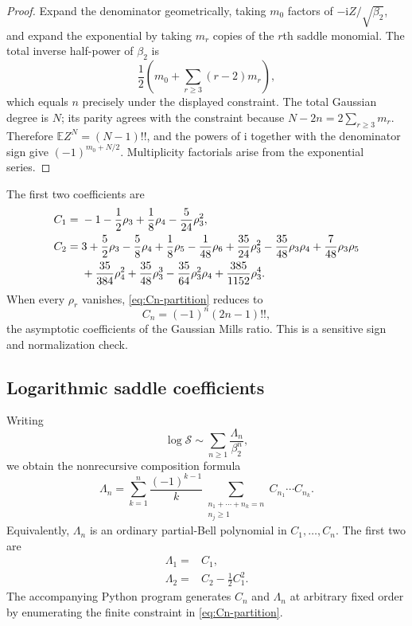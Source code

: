 \documentclass[11pt,oneside]{article}
\numberwithin{equation}{section}
\theoremstyle{definition}
\theoremstyle{remark}
\newcommand{\E}{\mathbb E}
\newcommand{\ii}{\mathrm i}
\begin{document}
\begin{proof}
Expand the denominator geometrically, taking $m_0$ factors of
$-\ii Z/\sqrt{\beta_2}$, and expand the exponential by taking $m_r$ copies of
the $r$th saddle monomial.  The total inverse half-power of $\beta_2$ is
\[
 \frac12\left(m_0+\sum_{r\ge3}(r-2)m_r\right),
\]
which equals $n$ precisely under the displayed constraint.  The total Gaussian
degree is $N$; its parity agrees with the constraint because
$N-2n=2\sum_{r\ge3}m_r$.  Therefore
$\E Z^N=(N-1)!!$, and the powers of $\ii$ together with the denominator sign
give $(-1)^{m_0+N/2}$.  Multiplicity factorials arise from the exponential
series.
\end{proof}

The first two coefficients are
\begin{align}
 C_1={}&-1-\frac12\rho_3+\frac18\rho_4-\frac5{24}\rho_3^2,
 \label{eq:C1}\\
 C_2={}&3+\frac52\rho_3-\frac58\rho_4+\frac18\rho_5-\frac1{48}\rho_6
 +\frac{35}{24}\rho_3^2-\frac{35}{48}\rho_3\rho_4
 +\frac7{48}\rho_3\rho_5
 \notag\\
 &+\frac{35}{384}\rho_4^2+\frac{35}{48}\rho_3^3
 -\frac{35}{64}\rho_3^2\rho_4+\frac{385}{1152}\rho_3^4.
 \label{eq:C2}
\end{align}
When every $\rho_r$ vanishes, \eqref{eq:Cn-partition} reduces to
\begin{equation}
 C_n=(-1)^n(2n-1)!!,
 \label{eq:Mills}
\end{equation}
the asymptotic coefficients of the Gaussian Mills ratio.  This is a sensitive
sign and normalization check.

\subsection{Logarithmic saddle coefficients}

Writing
\begin{equation}
 \log\mathcal S\sim\sum_{n\ge1}\frac{\Lambda_n}{\beta_2^n},
 \label{eq:Lambda-def}
\end{equation}
we obtain the nonrecursive composition formula
\begin{equation}
\boxed{
 \Lambda_n=
 \sum_{k=1}^n\frac{(-1)^{k-1}}k
 \sum_{\substack{n_1+\cdots+n_k=n\\n_j\ge1}}
 C_{n_1}\cdots C_{n_k}.}
 \label{eq:Lambda-composition}
\end{equation}
Equivalently, $\Lambda_n$ is an ordinary partial-Bell polynomial in
$C_1,\ldots,C_n$.  The first two are
\begin{align}
 \Lambda_1={}&C_1,
 \label{eq:Lambda1}\\
 \Lambda_2={}&C_2-\frac12C_1^2.
 \label{eq:Lambda2}
\end{align}
The accompanying Python program generates $C_n$ and $\Lambda_n$ at arbitrary
fixed order by enumerating the finite constraint in \eqref{eq:Cn-partition}.
\end{document}
